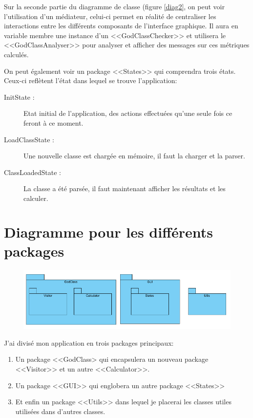 \documentclass[a4paper, 11pt]{article}
\begin{document}
	Sur la seconde partie du diagramme de classe (figure \ref{diag2}, on peut voir l'utilisation d'un médiateur, celui-ci permet en réalité de centraliser les interactions entre les différents composants de l'interface graphique. Il aura en variable membre une instance d'un <<GodClassChecker>> et utilisera le <<GodClassAnalyser>> pour analyser et afficher des messages sur ces métriques calculés.
	
	On peut également voir un package <<States>> qui comprendra trois états. Ceux-ci reflètent l'état dans lequel se trouve l'application:
	\begin{description}
		\item[InitState :] Etat initial de l'application, des actions effectuées qu'une seule fois ce feront à ce moment.
		\item[LoadClassState :] Une nouvelle classe est chargée en mémoire, il faut la charger et la parser.
		\item[ClassLoadedState :] La classe a été parsée, il faut maintenant afficher les résultats et les calculer.
	\end{description}
	
\section{Diagramme pour les différents packages}
	\begin{figure}[!h]
		\centering
		\includegraphics[scale=0.8]{Images/packages.png}
	\end{figure}
	
	J'ai divisé mon application en trois packages principaux: 
	\begin{enumerate}
		\item Un package <<GodClass> qui encapsulera un nouveau  package <<Visitor>> et un autre <<Calculator>>.
		\item Un package <<GUI>> qui englobera un autre package <<States>>
		\item Et enfin un package <<Utils>> dans lequel je placerai les classes utiles utilisées dans d'autres classes.
	\end{enumerate}
	
\end{document}
